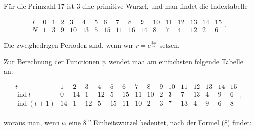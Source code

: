 
Für die Primzahl 17 ist 3 eine primitive Wurzel, und man
findet die Indextabelle

\[
\begin{array}{c|cccccccccccccccc}
I & 0 & 1 & 2 & 3 & 4 & 5 & 6 & 7 & 8 & 9 & 10 & 11 & 12 & 13 & 14 & 15\\
\hline
N & 1 & 3 & 9 & 10 & 13 & 5 & 15 & 11 & 16 & 14 & 8 & 7 & 4 & 12 & 2 & 6
\end{array}
.
\]

Die zweigliedrigen Perioden sind, wenn wir $r = e^{\frac{2\pi i}{17}}$ setzen,


Zur Berechnung der Functionen $\psi$ wendet man am einfachsten
folgende Tabelle an:

\[
\begin{array}{r|ccccccccccccccc}
t & 1 & 2 & 3 & 4 & 5 & 6 & 7 & 8 & 9 & 10 & 11 & 12 & 13 & 14 & 15\\
\hline
\operatorname{ind} t & 0 & 14 & 1 & 12 & 5 & 15 & 11 & 10 & 2 & 3 & 7 & 13 & 4 & 9 & 6 \\
\hline
\operatorname{ind}(t+1) & 14 & 1 & 12 & 5 & 15 & 11 & 10 & 2 & 3 & 7 & 13 & 4 & 9 & 6 & 8
\end{array}
,
\]

woraus man, wenn $\alpha$ eine 8\textsuperscript{te} Einheitswurzel bedeutet, nach der
Formel (8) findet:


